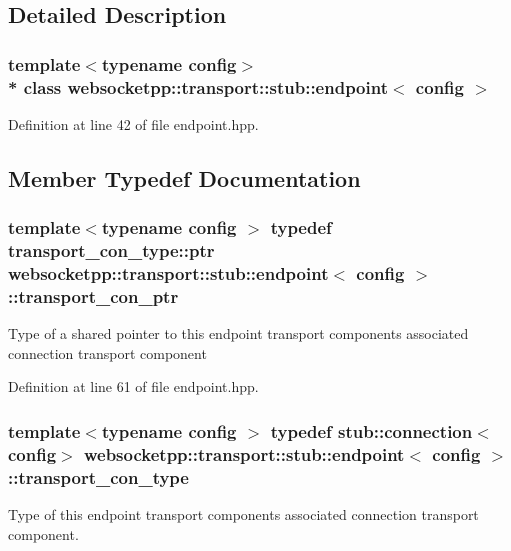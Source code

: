 \subsection{Detailed Description}
\subsubsection*{template$<$typename config$>$\\*
class websocketpp\+::transport\+::stub\+::endpoint$<$ config $>$}



Definition at line 42 of file endpoint.\+hpp.



\subsection{Member Typedef Documentation}
\subsubsection[{\texorpdfstring{transport\+\_\+con\+\_\+ptr}{transport\_con\_ptr}}]{\setlength{\rightskip}{0pt plus 5cm}template$<$typename config $>$ typedef {\bf transport\+\_\+con\+\_\+type\+::ptr} {\bf websocketpp\+::transport\+::stub\+::endpoint}$<$ {\bf config} $>$\+::{\bf transport\+\_\+con\+\_\+ptr}}\hypertarget{classwebsocketpp_1_1transport_1_1stub_1_1endpoint_af2bad83f2577d578712642e11767efe1}{}\label{classwebsocketpp_1_1transport_1_1stub_1_1endpoint_af2bad83f2577d578712642e11767efe1}
Type of a shared pointer to this endpoint transport component\textquotesingle{}s associated connection transport component 

Definition at line 61 of file endpoint.\+hpp.

\subsubsection[{\texorpdfstring{transport\+\_\+con\+\_\+type}{transport\_con\_type}}]{\setlength{\rightskip}{0pt plus 5cm}template$<$typename config $>$ typedef {\bf stub\+::connection}$<${\bf config}$>$ {\bf websocketpp\+::transport\+::stub\+::endpoint}$<$ {\bf config} $>$\+::{\bf transport\+\_\+con\+\_\+type}}\hypertarget{classwebsocketpp_1_1transport_1_1stub_1_1endpoint_a6486b94320ba134cb60a63b4c40194a0}{}\label{classwebsocketpp_1_1transport_1_1stub_1_1endpoint_a6486b94320ba134cb60a63b4c40194a0}
Type of this endpoint transport component\textquotesingle{}s associated connection transport component. 

